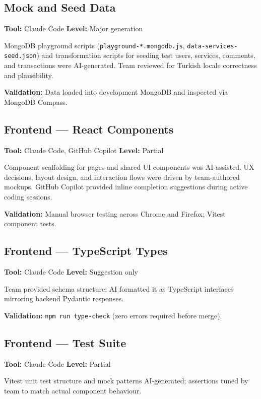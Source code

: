 \documentclass[11pt,a4paper]{report}
\begin{document}
\subsection{Mock and Seed Data}

\textbf{Tool:} Claude Code \quad \textbf{Level:} Major generation

MongoDB playground scripts (\texttt{playground-*.mongodb.js}, \texttt{data-services-seed.json}) and transformation scripts for seeding test users, services, comments, and transactions were AI-generated. Team reviewed for Turkish locale correctness and plausibility.

\textbf{Validation:} Data loaded into development MongoDB and inspected via MongoDB Compass.

\subsection{Frontend --- React Components}

\textbf{Tool:} Claude Code, GitHub Copilot \quad \textbf{Level:} Partial

Component scaffolding for pages and shared UI components was AI-assisted. UX decisions, layout design, and interaction flows were driven by team-authored mockups. GitHub Copilot provided inline completion suggestions during active coding sessions.

\textbf{Validation:} Manual browser testing across Chrome and Firefox; Vitest component tests.

\subsection{Frontend --- TypeScript Types}

\textbf{Tool:} Claude Code \quad \textbf{Level:} Suggestion only

Team provided schema structure; AI formatted it as TypeScript interfaces mirroring backend Pydantic responses.

\textbf{Validation:} \texttt{npm run type-check} (zero errors required before merge).

\subsection{Frontend --- Test Suite}

\textbf{Tool:} Claude Code \quad \textbf{Level:} Partial

Vitest unit test structure and mock patterns AI-generated; assertions tuned by team to match actual component behaviour.
\end{document}

